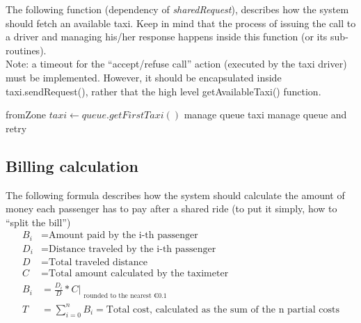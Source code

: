 The following function (dependency of \textit{sharedRequest}), describes how the system should fetch an available taxi.
Keep in mind that the process of issuing the call to a driver and managing his/her response happens inside this function
(or its sub-routines). \\
Note: a timeout for the ``accept/refuse call'' action (executed by the taxi driver) must be implemented. However, it
should be encapsulated inside taxi.sendRequest(), rather that the high level getAvailableTaxi() function.
\begin{algorithmic}
 {fromZone}
       \State $ taxi \gets queue.getFirstTaxi() $
         \State manage queue
         \Return taxi
     \Else 
         \State manage queue and retry
    \EndIf
\EndIf
\EndFor
\EndFunction


\end{algorithmic}

\subsection{Billing calculation}
The following formula describes how the system should calculate the amount of money each passenger
has to pay after a shared ride (to put it simply, how to ``split the bill'') %
\begin{align*}
 B_{i} &= \text{Amount paid by the i-th passenger} \\
 D_{i} &= \text{Distance traveled by the i-th passenger} \\
 D &= \text{Total traveled distance} \\
 C &= \text{Total amount calculated by the taximeter} \\
 B_{i} &= \frac{D_{i}}{D} * C |_{\substack{\text{rounded to the nearest €0.1 }}} \\
 T &= \sum_{i=0}^{n} B_{i} = \text{Total cost, calculated as the sum of the n partial costs}
\end{align*}